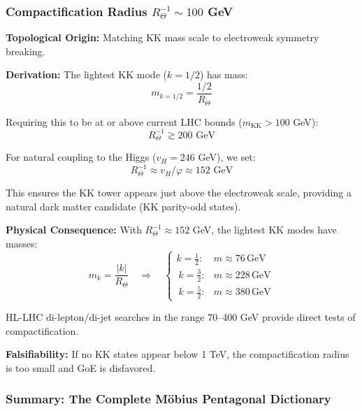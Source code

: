 \documentclass[12pt]{article}
\begin{document}
\subsubsection{Compactification Radius $R_\Theta^{-1} \sim 100$ GeV}

\textbf{Topological Origin:} Matching KK mass scale to electroweak symmetry breaking.

\textbf{Derivation:} The lightest KK mode ($k = 1/2$) has mass:
\begin{equation}
m_{k=1/2} = \frac{1/2}{R_\Theta}
\end{equation}

Requiring this to be at or above current LHC bounds ($m_{\text{KK}} > 100$ GeV):
\begin{equation}
R_\Theta^{-1} \gtrsim 200 \text{ GeV}
\end{equation}

For natural coupling to the Higgs ($v_H = 246$ GeV), we set:
\begin{equation}
R_\Theta^{-1} \approx v_H / \varphi \approx 152 \text{ GeV}
\end{equation}

This ensures the KK tower appears just above the electroweak scale, providing a natural dark matter candidate (KK parity-odd states).

\textbf{Physical Consequence:} With $R_\Theta^{-1} \approx 152$ GeV, the lightest KK modes have masses:
\begin{equation}
m_k = \frac{|k|}{R_\Theta} \quad \Rightarrow \quad \begin{cases}
k = \tfrac{1}{2}: & m \approx 76\,\text{GeV} \\\
k = \tfrac{3}{2}: & m \approx 228\,\text{GeV} \\\
k = \tfrac{5}{2}: & m \approx 380\,\text{GeV}
\end{cases}
\end{equation}

HL-LHC di-lepton/di-jet searches in the range 70–400 GeV provide direct tests of compactification.

\textbf{Falsifiability:} If no KK states appear below 1 TeV, the compactification radius is too small and GoE is disfavored.

\subsubsection{Summary: The Complete M\"obius Pentagonal Dictionary}
\end{document}
